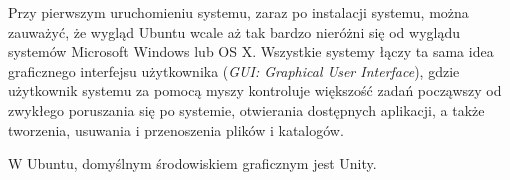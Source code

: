 Przy pierwszym uruchomieniu systemu, zaraz po instalacji systemu, można zauważyć, że wygląd Ubuntu wcale aż tak bardzo nieróżni się od wyglądu systemów Microsoft Windows lub OS X. Wszystkie systemy łączy ta sama idea graficznego interfejsu użytkownika (\textit{GUI: Graphical User Interface}), gdzie użytkownik systemu za pomocą myszy kontroluje większość zadań począwszy od zwykłego poruszania się po systemie, otwierania dostępnych aplikacji, a także tworzenia, usuwania i przenoszenia plików i katalogów.

W Ubuntu, domyślnym środowiskiem graficznym jest Unity.